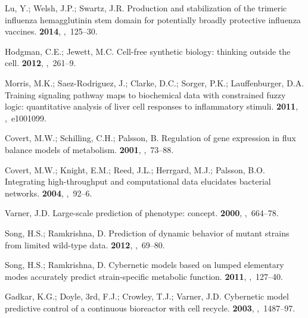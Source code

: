 \documentclass[processes,article,accept,moreauthors,pdftex,12pt,a4paper]{mdpi}
\begin{document}
\begin{thebibliography}{----}
Lu, Y.; Welsh, J.P.; Swartz, J.R.
\newblock Production and stabilization of the trimeric influenza hemagglutinin
  stem domain for potentially broadly protective influenza vaccines.
 {\bf 2014},
,~125--30.

Hodgman, C.E.; Jewett, M.C.
\newblock Cell-free synthetic biology: thinking outside the cell.
 {\bf 2012},
,~261--9.

Morris, M.K.; Saez-Rodriguez, J.; Clarke, D.C.; Sorger, P.K.; Lauffenburger,
  D.A.
\newblock Training signaling pathway maps to biochemical data with constrained
  fuzzy logic: quantitative analysis of liver cell responses to inflammatory
  stimuli.
 {\bf 2011},
,~e1001099.

Covert, M.W.; Schilling, C.H.; Palsson, B.
\newblock Regulation of gene expression in flux balance models of metabolism.
 {\bf 2001},
,~73--88.

Covert, M.W.; Knight, E.M.; Reed, J.L.; Herrgard, M.J.; Palsson, B.O.
\newblock Integrating high-throughput and computational data elucidates
  bacterial networks.
 {\bf 2004},
,~92--6.

Varner, J.D.
\newblock Large-scale prediction of phenotype: concept.
 {\bf 2000},
,~664--78.

Song, H.S.; Ramkrishna, D.
\newblock Prediction of dynamic behavior of mutant strains from limited
  wild-type data.
 {\bf 2012},
,~69--80.

Song, H.S.; Ramkrishna, D.
\newblock Cybernetic models based on lumped elementary modes accurately predict
  strain-specific metabolic function.
 {\bf 2011},
,~127--40.

Gadkar, K.G.; Doyle, 3rd, F.J.; Crowley, T.J.; Varner, J.D.
\newblock Cybernetic model predictive control of a continuous bioreactor with
  cell recycle.
 {\bf 2003},
,~1487--97.


\end{thebibliography}
\end{document}
